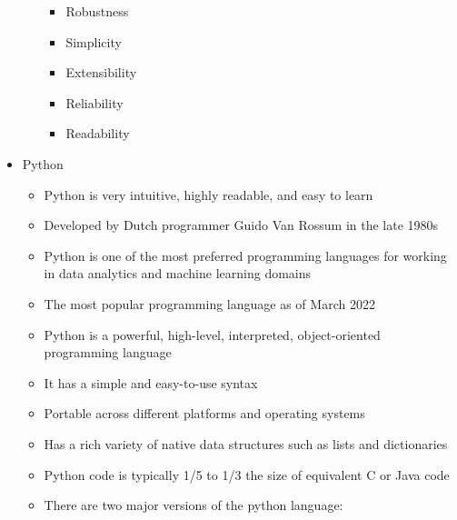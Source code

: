 \begin{itemize}
\begin{itemize}
\begin{itemize}
          \item Robustness

          \item Simplicity

          \item Extensibility

          \item Reliability

          \item Readability

        \end{itemize}

    \end{itemize}

  \item Python

    \begin{itemize}

      \item Python is very intuitive, highly readable, and easy to learn

      \item Developed by Dutch programmer Guido Van Rossum in the late 1980s

      \item Python is one of the most preferred programming languages for working in data analytics and machine learning domains

      \item The most popular programming language as of March 2022

      \item Python is a powerful, high-level, interpreted, object-oriented programming language

      \item It has a simple and easy-to-use syntax

      \item Portable across different platforms and operating systems

      \item Has a rich variety of native data structures such as lists and dictionaries

      \item Python code is typically 1/5 to 1/3 the size of equivalent C or Java code

      \item There are two major versions of the python language:

        \begin{itemize}


\end{itemize}
\end{itemize}
\end{itemize}
